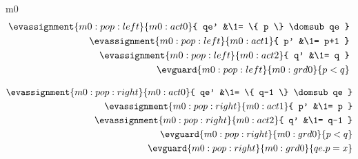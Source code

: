 \documentclass[12pt]{amsart}
\begin{document}
\begin{machine}{m0}
\begin{align*}
\evassignment{m0:pop:left}{m0:act0}{ qe' &\1= \{ p \} \domsub qe }
\\ \evassignment{m0:pop:left}{m0:act1}{ p' &\1= p+1 }
\\ \evassignment{m0:pop:left}{m0:act2}{ q' &\1= q }
\\ \evguard{m0:pop:left}{m0:grd0}{ p < q }
\end{align*}


\begin{align*}
\evassignment{m0:pop:right}{m0:act0}{ qe' &\1= \{ q-1 \} \domsub qe }
\\ \evassignment{m0:pop:right}{m0:act1}{ p' &\1= p }
\\ \evassignment{m0:pop:right}{m0:act2}{ q' &\1= q-1 }
\\ \evguard{m0:pop:right}{m0:grd0}{ p < q }
\\ \evguard{m0:pop:right}{m0:grd0}{ qe.p = x }
\end{align*}

\end{machine}
\end{document}
